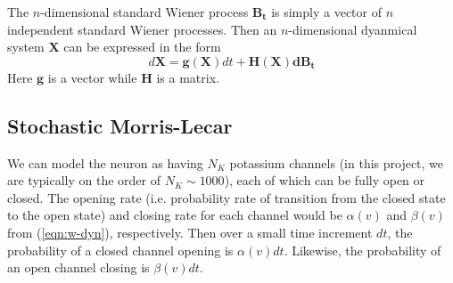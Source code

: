 \documentclass[letterpaper,12pt]{article}
\numberwithin{table}{section}
\numberwithin{figure}{section}
\numberwithin{equation}{section}
\begin{document}
\begin{flushleft}
    The $n$-dimensional standard Wiener process $\mathbf{B_t}$ is simply a vector of $n$ independent standard Wiener processes. Then an $n$-dimensional dyanmical system $\mathbf{X}$ can be expressed in the form
    \begin{equation}
        \label{eqn:sde-general}
        d\mathbf{X} = \mathbf{g}(\mathbf{X}) dt + \mathbf{H}(\mathbf{X}) \mathbf{dB_t}
    \end{equation}
    Here $\mathbf{g}$ is a vector while $\mathbf{H}$ is a matrix.

    \subsection{Stochastic Morris-Lecar}

    We can model the neuron as having $N_K$ potassium channels (in this project, we are typically on the order of $N_K \sim 1000$), each of which can be fully open or closed. The opening rate (i.e. probability rate of transition from the closed state to the open state) and closing rate for each channel would be $\alpha(v)$ and $\beta(v)$ from (\ref{eqn:w-dyn}), respectively. Then over a small time increment $dt$, the probability of a closed channel opening is $\alpha(v) dt$. Likewise, the probability of an open channel closing is $\beta(v) dt$.


\end{flushleft}
\end{document}

